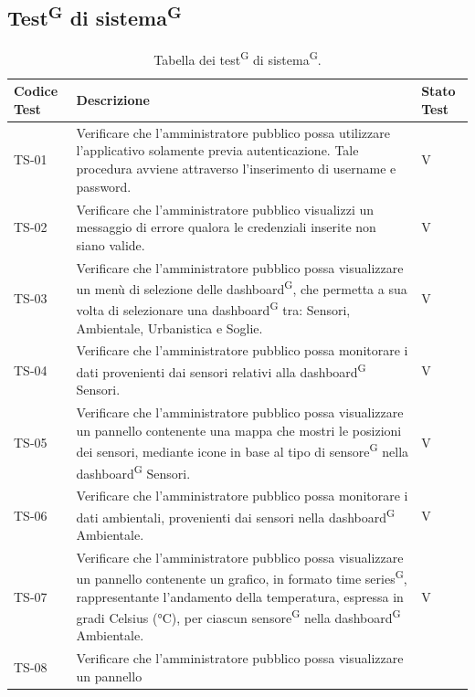 \documentclass[8pt]{article}
\newcommand{\glossterm}[1]{#1\textsuperscript{G}} %
\begin{document}
\subsection{\glossterm{Test} di \glossterm{sistema}}
\renewcommand{\arraystretch}{2.5}
\begin{longtable}{|>{\centering}p{2cm}|>{\RaggedRight}m{12cm}|>{\centering\arraybackslash}p{2cm}|}
    \hline
    \rowcolor{white}
    \textbf{Codice Test} & \textbf{Descrizione} & \textbf{Stato Test} \\
    \hline
    \endfirsthead 
    \rowcolor{white}
    \caption{Tabella dei \glossterm{test} di \glossterm{sistema}.} 
    \label{table:Tabella dei test di sistema}
    \endlastfoot 
    TS-01 & Verificare che l'amministratore pubblico possa utilizzare l'applicativo solamente previa autenticazione. Tale procedura avviene attraverso l'inserimento di username e password. & V\\
    \hline
    TS-02 & Verificare che l'amministratore pubblico visualizzi un messaggio di errore qualora le credenziali inserite non siano valide. & V\\
    \hline
    TS-03 & Verificare che l'amministratore pubblico possa visualizzare un menù di selezione delle
    \glossterm{dashboard}, che permetta a sua volta di selezionare una \glossterm{dashboard} tra: Sensori, Ambientale, Urbanistica e Soglie. & V\\
    \hline
    TS-04 & Verificare che l'amministratore pubblico possa monitorare i dati
    provenienti dai sensori relativi alla \glossterm{dashboard} Sensori.
    & V \\
    \hline
    TS-05 & Verificare che l'amministratore pubblico possa visualizzare un pannello
    contenente una mappa che mostri le posizioni dei sensori, mediante icone in base al tipo di \glossterm{sensore} nella \glossterm{dashboard} Sensori.
    & V \\
    \hline
    TS-06 & Verificare che l'amministratore pubblico possa monitorare i dati ambientali, provenienti
    dai sensori nella \glossterm{dashboard} Ambientale.
    & V \\
    \hline
    TS-07 & Verificare che l'amministratore pubblico possa visualizzare un pannello
    contenente un grafico, in formato \glossterm{time series}, rappresentante l'andamento della temperatura,
    espressa in gradi Celsius (°C), per ciascun \glossterm{sensore} nella \glossterm{dashboard} Ambientale.
    & V \\
    \hline
    TS-08 & Verificare che l'amministratore pubblico possa visualizzare un pannello

\end{longtable}
\end{document}
